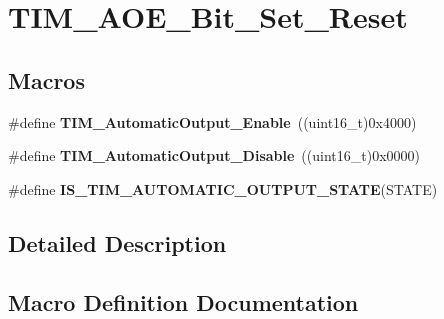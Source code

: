 \hypertarget{group___t_i_m___a_o_e___bit___set___reset}{}\section{T\+I\+M\+\_\+\+A\+O\+E\+\_\+\+Bit\+\_\+\+Set\+\_\+\+Reset}
\label{group___t_i_m___a_o_e___bit___set___reset}
\subsection*{Macros}
\begin{DoxyCompactItemize}
\item 
\#define {\bfseries T\+I\+M\+\_\+\+Automatic\+Output\+\_\+\+Enable}~((uint16\+\_\+t)0x4000)\hypertarget{group___t_i_m___a_o_e___bit___set___reset_gaa416873d01fe62fe8d3f9c8bb7853fa1}{}\label{group___t_i_m___a_o_e___bit___set___reset_gaa416873d01fe62fe8d3f9c8bb7853fa1}

\item 
\#define {\bfseries T\+I\+M\+\_\+\+Automatic\+Output\+\_\+\+Disable}~((uint16\+\_\+t)0x0000)\hypertarget{group___t_i_m___a_o_e___bit___set___reset_ga0f80ba4fbadd434bc82ca63e904ace41}{}\label{group___t_i_m___a_o_e___bit___set___reset_ga0f80ba4fbadd434bc82ca63e904ace41}

\item 
\#define {\bfseries I\+S\+\_\+\+T\+I\+M\+\_\+\+A\+U\+T\+O\+M\+A\+T\+I\+C\+\_\+\+O\+U\+T\+P\+U\+T\+\_\+\+S\+T\+A\+TE}(S\+T\+A\+TE)
\end{DoxyCompactItemize}


\subsection{Detailed Description}


\subsection{Macro Definition Documentation}
